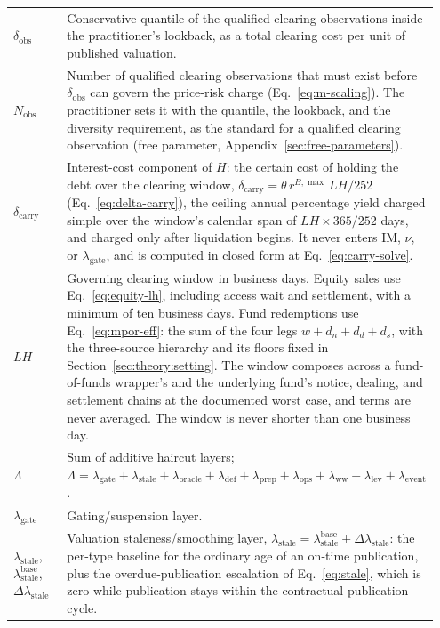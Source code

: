 \begin{longtable}{@{}p{0.18\linewidth} p{0.77\linewidth}@{}}
$\delta_{\mathrm{obs}}$ & Conservative quantile of the qualified clearing observations inside the practitioner's lookback, as a total clearing cost per unit of published valuation.\\
$N_{\mathrm{obs}}$ & Number of qualified clearing observations that must exist before $\delta_{\mathrm{obs}}$ can govern the price-risk charge (Eq.~\eqref{eq:m-scaling}). The practitioner sets it with the quantile, the lookback, and the diversity requirement, as the standard for a qualified clearing observation (free parameter, Appendix~\ref{sec:free-parameters}).\\
$\delta_{\mathrm{carry}}$ & Interest-cost component of $H$: the certain cost of holding the debt over the clearing window, $\delta_{\mathrm{carry}} = \theta\, r^{B,\max}\, LH/252$ (Eq.~\eqref{eq:delta-carry}), the ceiling annual percentage yield charged simple over the window's calendar span of $LH\times365/252$ days, and charged only after liquidation begins. It never enters $\mathrm{IM}$, $\nu$, or $\lambda_{\mathrm{gate}}$, and is computed in closed form at Eq.~\eqref{eq:carry-solve}.\\
$LH$ & Governing clearing window in business days. Equity sales use Eq.~\eqref{eq:equity-lh}, including access wait and settlement, with a minimum of ten business days. Fund redemptions use Eq.~\eqref{eq:mpor-eff}: the sum of the four legs $w+d_n+d_d+d_s$, with the three-source hierarchy and its floors fixed in Section~\ref{sec:theory:setting}. The window composes across a fund-of-funds wrapper's and the underlying fund's notice, dealing, and settlement chains at the documented worst case, and terms are never averaged. The window is never shorter than one business day.\\
$\Lambda$ & Sum of additive haircut layers; $\Lambda = \lambda_{\mathrm{gate}} + \lambda_{\mathrm{stale}} + \lambda_{\mathrm{oracle}} + \lambda_{\mathrm{def}} + \lambda_{\mathrm{prep}} + \lambda_{\mathrm{ops}} + \lambda_{\mathrm{ww}} + \lambda_{\mathrm{lev}} + \lambda_{\mathrm{event}}$.\\
$\lambda_{\mathrm{gate}}$ & Gating/suspension layer.\\
$\lambda_{\mathrm{stale}}$, $\lambda^{\mathrm{base}}_{\mathrm{stale}}$, $\Delta\lambda_{\mathrm{stale}}$ & Valuation staleness/smoothing layer, $\lambda_{\mathrm{stale}} = \lambda^{\mathrm{base}}_{\mathrm{stale}} + \Delta\lambda_{\mathrm{stale}}$: the per-type baseline for the ordinary age of an on-time publication, plus the overdue-publication escalation of Eq.~\eqref{eq:stale}, which is zero while publication stays within the contractual publication cycle.\\

\end{longtable}
